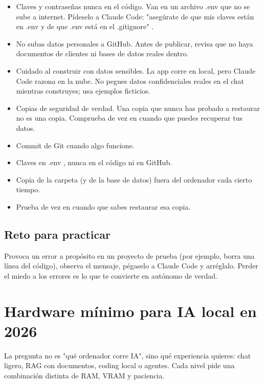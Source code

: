 \documentclass[11pt,a4paper]{book}
\begin{document}
\begin{itemize}\item Claves y contraseñas nunca en el código. Van en un archivo .env que no se sube a internet. Pídeselo a Claude Code: "asegúrate de que mis claves están en .env y de que .env está en el .gitignore" .\end{itemize}
\begin{itemize}\item No subas datos personales a GitHub. Antes de publicar, revisa que no haya documentos de clientes ni bases de datos reales dentro.\end{itemize}
\begin{itemize}\item Cuidado al construir con datos sensibles. La app corre en local, pero Claude Code razona en la nube. No pegues datos confidenciales reales en el chat mientras construyes; usa ejemplos ficticios.\end{itemize}
\begin{itemize}\item Copias de seguridad de verdad. Una copia que nunca has probado a restaurar no es una copia. Comprueba de vez en cuando que puedes recuperar tus datos.\end{itemize}
\begin{itemize}\item Commit de Git cuando algo funcione.\end{itemize}
\begin{itemize}\item Claves en .env , nunca en el código ni en GitHub.\end{itemize}
\begin{itemize}\item Copia de la carpeta (y de la base de datos) fuera del ordenador cada cierto tiempo.\end{itemize}
\begin{itemize}\item Prueba de vez en cuando que sabes restaurar esa copia.\end{itemize}
\section{Reto para practicar}
Provoca un error a propósito en un proyecto de prueba (por ejemplo, borra una línea del código), observa el mensaje, pégaselo a Claude Code y arréglalo. Perder el miedo a los errores es lo que te convierte en autónomo de verdad.

\chapter{Hardware mínimo para IA local en 2026}
La pregunta no es "qué ordenador corre IA", sino qué experiencia quieres: chat ligero, RAG con documentos, coding local o agentes. Cada nivel pide una combinación distinta de RAM, VRAM y paciencia.
\end{document}
